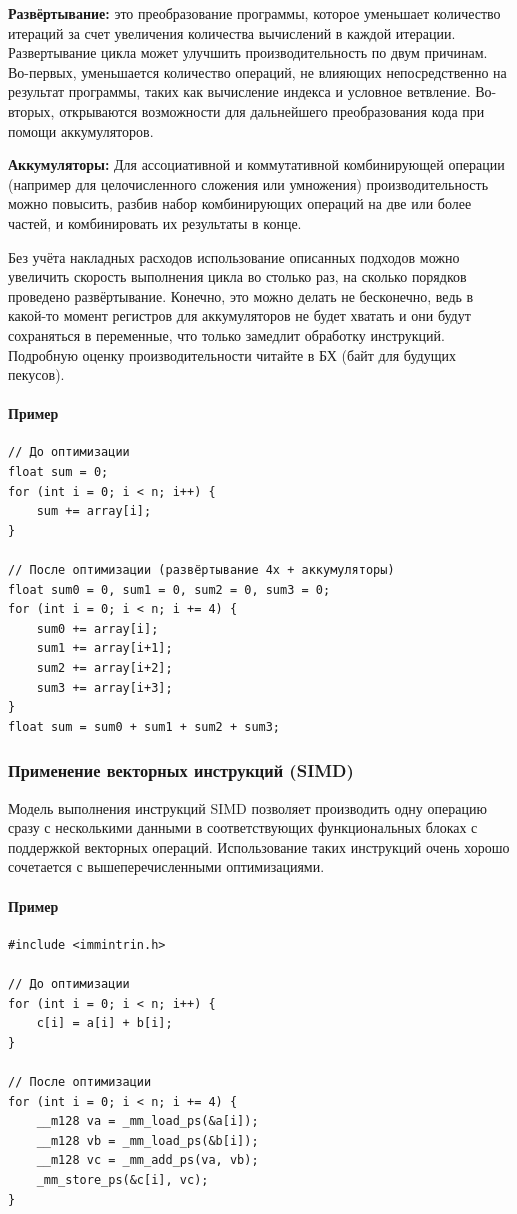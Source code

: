 \documentclass[12pt,a4paper]{article}
\begin{document}
\textbf{Развёртывание: } это преобразование программы, которое уменьшает количество итераций за счет увеличения количества вычислений в каж­дой итерации. Развертывание цикла может улучшить производительность по двум причинам. Во-первых, уменьшается количество операций, не влияющих непосредственно на результат программы, таких как вычисление индекса и условное ветвление. Во-вторых, открываются возможности для дальнейшего преобразования кода при помощи аккумуляторов.

\textbf{Аккумуляторы: } Для ассоциативной и коммутативной комбинирующей операции (например для целочисленного сложения или умножения) производительность можно повысить, разбив набор комбинирующих операций на две или более частей, и комбинировать их результаты в конце. 

Без учёта накладных расходов использование описанных подходов можно увеличить скорость выполнения цикла во столько раз, на сколько порядков проведено развёртывание. Конечно, это можно делать не бесконечно, ведь в какой-то момент регистров для аккумуляторов не будет хватать и они будут сохраняться в переменные, что только замедлит обработку инструкций. Подробную оценку производительности читайте в БХ (байт для будущих пекусов).

\paragraph{Пример}
\begin{verbatim}
// До оптимизации
float sum = 0;
for (int i = 0; i < n; i++) {
    sum += array[i];
}

// После оптимизации (развёртывание 4x + аккумуляторы)
float sum0 = 0, sum1 = 0, sum2 = 0, sum3 = 0;
for (int i = 0; i < n; i += 4) {
    sum0 += array[i];
    sum1 += array[i+1];
    sum2 += array[i+2];
    sum3 += array[i+3];
}
float sum = sum0 + sum1 + sum2 + sum3;
\end{verbatim}

\subsubsection{Применение векторных инструкций (SIMD)}

Модель выполнения инструкций SIMD позволяет производить одну операцию сразу с несколькими данными в соответствующих функциональных блоках с поддержкой векторных операций. Использование таких инструкций очень хорошо сочетается с вышеперечисленными оптимизациями. 

\paragraph{Пример}
\begin{verbatim}
#include <immintrin.h>

// До оптимизации
for (int i = 0; i < n; i++) {
    c[i] = a[i] + b[i];
}

// После оптимизации
for (int i = 0; i < n; i += 4) {
    __m128 va = _mm_load_ps(&a[i]);
    __m128 vb = _mm_load_ps(&b[i]);
    __m128 vc = _mm_add_ps(va, vb);
    _mm_store_ps(&c[i], vc);
}
\end{verbatim}
\end{document}
